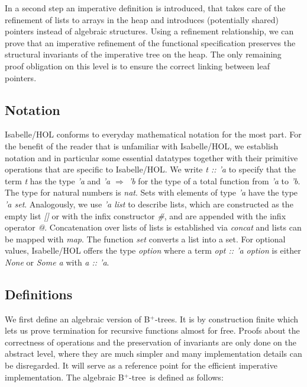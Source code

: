 \documentclass[a4paper,UKenglish,cleveref, autoref, thm-restate]{lipics-v2021}
\newcommand{\btree}{B$^+$-tree}
\newcommand{\btrees}{B$^+$-trees}
\begin{document}
In a second step an imperative definition is introduced,
that takes care of the refinement of lists to arrays in the heap
and introduces (potentially shared) pointers instead of algebraic structures.
Using a refinement relationship, we can prove that an imperative refinement
of the functional specification preserves the structural invariants
of the imperative tree on the heap.
The only remaining proof obligation on this level is to ensure the correct linking
between leaf pointers.

\subsection{Notation}

Isabelle/HOL conforms to everyday mathematical notation for the most part.
For the benefit of the reader that is unfamiliar with Isabelle/HOL, we establish
notation and in particular some essential datatypes together with their primitive
operations that are specific to Isabelle/HOL. We write \textit{t :: 'a} to specify that
the term \textit{t} has the type \textit{'a} and \textit{'a $\Rightarrow$ 'b}
for the type of a total function from \textit{'a} to \textit{'b}.
The type for natural numbers is \textit{nat}.
Sets with elements of type \textit{'a} have the type \textit{'a set}.
Analogously, we use \textit{'a list} to describe lists, which are constructed as the empty
list \textit{[]} or with the infix constructor \textit{\#}, and are appended with the infix operator
\textit{@}. Concatenation over lists of lists is established via \textit{concat}
and lists can be mapped with \textit{map}.
The function \textit{set} converts a list into a set. For optional values, Isabelle/HOL
offers the type \textit{option} where a term \textit{opt :: 'a option} is either \textit{None} or \textit{Some a}
with \textit{a :: 'a}.

\subsection{Definitions}
\label{sec:data_structure_defs}


We first define an algebraic version of \btrees.
It is by construction finite which lets us prove termination for recursive functions almost for free.
Proofs about the correctness of operations and the preservation of invariants
are only done on the abstract level, where they are much simpler
and many implementation details can be disregarded.
It will serve as a reference point for the efficient
imperative implementation.
The algebraic \btree\ is defined as follows:
\end{document}
